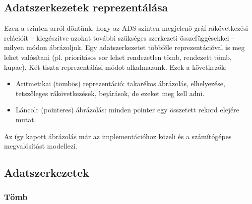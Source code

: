 \documentclass[12pt,margin=0px]{article}
\begin{document}
    \subsection*{Adatszerkezetek reprezentálása}

    \noindent Ezen a szinten arról döntünk, hogy az ADS-szinten megjelenő gráf rákövetkezési relációit – kiegészítve azokat további szükséges szerkezeti összefüggésekkel – milyen módon ábrázoljuk. Egy adatszerkezetet többféle reprezentációval is meg lehet valósítani (pl. prioritásos sor lehet rendezetlen tömb, rendezett tömb, kupac). Két tiszta reprezentálási módot alkalmazunk.  Ezek a következők:
    \begin{itemize}
        \item Aritmetikai (tömbös) reprezentáció:  takarékos ábrázolás, elhelyezése, tetszőleges rákövetkezések, bejárások, de ezeket meg kell adni.
        \item Láncolt (pointeres) ábrázolás: minden pointer egy összetett rekord elejére mutat.
    \end{itemize}
    Az így kapott ábrázolás már az implementációhoz közeli és a számítógépes megvalósítást modellezi.

	\subsection*{Adatszerkezetek}

    \subsubsection*{Tömb}
\end{document}

